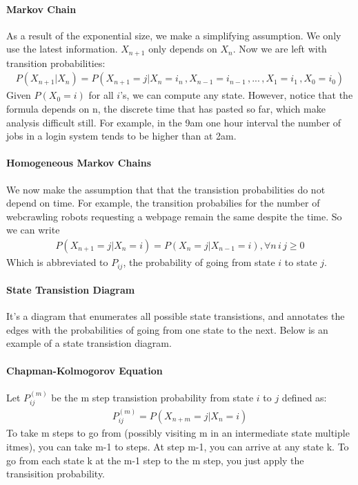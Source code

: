 \paragraph{Markov Chain} As a result of the exponential size, we make a
simplifying assumption. We only use the latest information. $X_{n+1}$ only
depends on $X_n$. Now we are left with transition probabilities:
\begin{equation*} \begin{split}
	P(X_{n+1} | X_n) = P(X_{n+1} = j | X_n = i_n\, , X_{n-1} = i_{n-1}\, , ... \, , X_1 = i_1\, ,X_0 = i_0)
\end{split} \end{equation*}
Given $P(X_0 = i)$ for all $i$'s, we can compute any state. However, notice that
the formula depends on n, the discrete time that has pasted so far, which make
analysis difficult still. For example, in the 9am one hour interval the number
of jobs in a login system tends to be higher than at 2am.

\paragraph{Homogeneous Markov Chains} We now make the assumption that that the
transistion probabilities do not depend on time. For example, the transition
probabilies for the number of webcrawling robots requesting a webpage remain the
same despite the time. So we can write
\begin{equation*} \begin{split}
	P(X_{n+1} = j | X_n = i ) = P(X_{n} =j | X_{n-1} = i ), \forall n\,i\,j \ge 0
\end{split} \end{equation*}
Which is abbreviated to $P_{ij}$, the probability of going from state $i$ to state
$j$.


\paragraph{State Transistion Diagram} It's a diagram that enumerates all
possible state transistions, and annotates the edges with the probabilities of
going from one state to the next. Below is an example of a state transistion
diagram.


\paragraph{Chapman-Kolmogorov Equation}  \label{chap-komo-eq-explain}
Let $P_{ij}^{(m)}$ be the m step transistion probability from state $i$ to $j$
defined as:
\begin{equation*} \begin{split}
	P_{ij}^{(m)} = P(X_{n+m} = j | X_n = i)
\end{split} \end{equation*}
To take m steps to go from (possibly visiting m in an intermediate state
multiple itmes), you can take m-1 to steps. At step m-1, you can arrive at any
state k. To go from each state k at the m-1 step to the m step, you just apply
the transisition probability.

